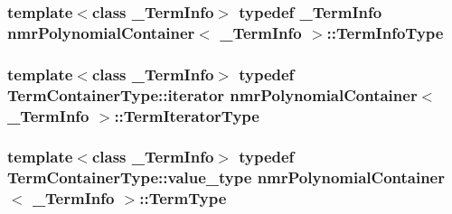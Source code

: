\hypertarget{classnmr_polynomial_container_acc456652a77699f540082b3f285ac460}{
\subsubsection[{Term\-Info\-Type}]{\setlength{\rightskip}{0pt plus 5cm}template$<$class \-\_\-\-Term\-Info$>$ typedef \-\_\-\-Term\-Info {\bf nmr\-Polynomial\-Container}$<$ \-\_\-\-Term\-Info $>$\-::{\bf Term\-Info\-Type}}}\label{classnmr_polynomial_container_acc456652a77699f540082b3f285ac460}
\hypertarget{classnmr_polynomial_container_a276e57445d038e8a16462f47b85719a3}{
\subsubsection[{Term\-Iterator\-Type}]{\setlength{\rightskip}{0pt plus 5cm}template$<$class \-\_\-\-Term\-Info$>$ typedef Term\-Container\-Type\-::iterator {\bf nmr\-Polynomial\-Container}$<$ \-\_\-\-Term\-Info $>$\-::{\bf Term\-Iterator\-Type}}}\label{classnmr_polynomial_container_a276e57445d038e8a16462f47b85719a3}
\hypertarget{classnmr_polynomial_container_a64089fefb243ca7cd6fc412083f9fa9d}{
\subsubsection[{Term\-Type}]{\setlength{\rightskip}{0pt plus 5cm}template$<$class \-\_\-\-Term\-Info$>$ typedef Term\-Container\-Type\-::value\-\_\-type {\bf nmr\-Polynomial\-Container}$<$ \-\_\-\-Term\-Info $>$\-::{\bf Term\-Type}}}\label{classnmr_polynomial_container_a64089fefb243ca7cd6fc412083f9fa9d}


